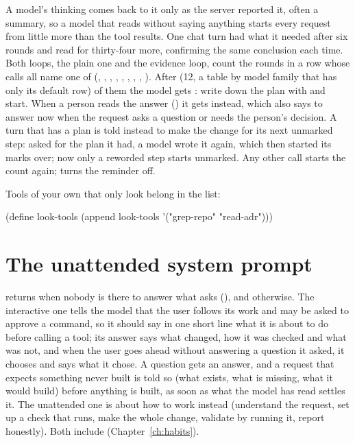 A model's thinking comes back to it only as the server reported it, often
a summary, so a model that reads without saying anything starts every
request from little more than the tool results. One chat turn
had what it needed after six rounds and read for thirty-four more,
confirming the same conclusion each time. Both loops, the plain one and
the evidence loop, count the rounds in a row whose calls all name one of
 (, , ,
, , ,
, , ). After  (12, a table by model
family that has only its default row) of them the model
gets : write down the plan with
 and start. When a person reads the answer
() it gets 
instead, which also says to answer now when the request asks a question or
needs the person's decision. A turn that has a plan is told instead to make
the change for its next unmarked step: asked for the plan it had, a model
wrote it again, which then started its marks over; now only a reworded
step starts unmarked. Any other call starts the count again;
 turns the reminder off.

\begin{tip}
Tools of your own that only look belong in the list:
\begin{scm}
(define look-tools (append look-tools '("grep-repo" "read-adr")))
\end{scm}
\end{tip}

\section{The unattended system prompt}

 returns 
when nobody is there to answer what asks (), and
 otherwise. The interactive one
tells the model that the user follows its work and may be asked to approve
a command, so it should say in one short line what it is about to do before
calling a tool; its answer says what changed, how it was checked and what was
not, and when the user goes ahead without answering a question it asked, it
chooses and says what it chose. A question gets an answer, and a request
that expects something never built is told so (what exists, what is
missing, what it would build) before anything is built, as soon as what the
model has read settles it. The unattended one is about how to work instead (understand
the request, set up a check that runs, make the whole change, validate by
running it, report honestly). Both include 
(Chapter~\ref{ch:habits}).

